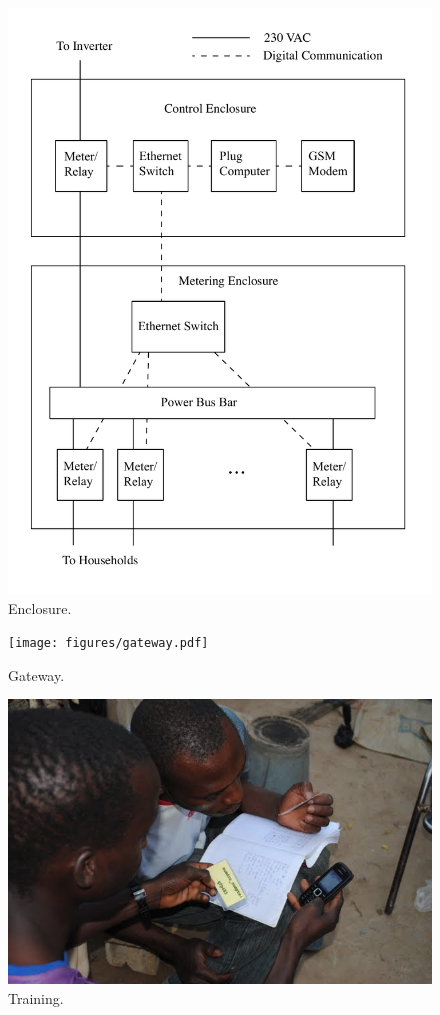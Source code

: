 \documentclass[conference]{IEEEtran}
\begin{document}
\begin{figure}[]
\begin{center}
\includegraphics[width=\columnwidth]{figures/Enclosure.pdf}
\end{center}
\caption{Enclosure.}
\label{Enclosure}
\end{figure}


\begin{figure}[]
\begin{center}
\texttt{[image: figures/gateway.pdf]}
\end{center}
\caption{Gateway.}
\label{gateway}
\end{figure}

\begin{figure}[]
\begin{center}
\includegraphics[width=\columnwidth]{figures/training.jpg}
\end{center}
\caption{Training.}
\label{training}
\end{figure}





\end{document}
